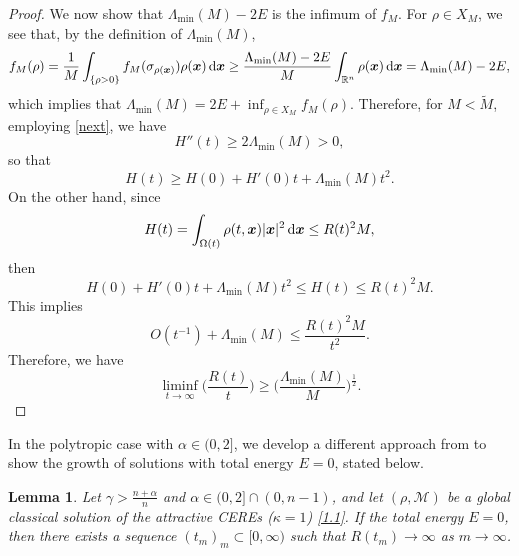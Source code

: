 \documentclass[reqno,11pt]{amsart}
\numberwithin{equation}{section}
\newtheorem{lemma}[theorem]{Lemma}
\theoremstyle{definition}
\def\dd{{\, \rm d}}
\begin{document}
\begin{proof}
We now show that $ \Lambda_{\min}(M) - 2E$ is the infimum of $f_M$. 
For $\rho \in X_M$, we see that, by the definition of $\Lambda_{\min}(M)$, 
\begin{equation*} 
    f_M(\rho) = \frac{1}{M}\int_{\{ \rho > 0 \}} f_M(\sigma_{\rho(\boldsymbol{x})}) \rho(\boldsymbol{x}) \dd \boldsymbol{x}  \geq \frac{ \Lambda_{\min}(M) -2E}{M} \int_{\mathbb{R}^n} \rho(\boldsymbol{x}) \dd \boldsymbol{x} =  \Lambda_{\min}(M) - 2E,
\end{equation*}
which implies that $\Lambda_{\min}(M) = 2E + \inf_{\rho \in X_M} f_M(\rho)$. 
Therefore, for $M < \tilde{M}$, employing \eqref{next}, we have
\[ H''(t) \geq 2 \Lambda_{\min}(M) > 0,
\]
so that 
$$
H(t)\geq H(0)+H'(0)t+ \Lambda_{\min}(M) t^2.
$$
On the other hand, since
$$
H(t)=\int_{\Omega(t)}\rho(t,\boldsymbol{x})|\boldsymbol{x}|^2\dd \boldsymbol{x}\leq R(t)^2M,
$$
then
$$
H(0)+H'(0)t+\Lambda_{\min}(M)t^2\leq H(t)\leq R(t)^2M.
$$
This implies
$$
O(t^{-1})+\Lambda_{\min}(M)\leq \frac{R(t)^2M}{t^2}.
$$
Therefore, we have
$$
\liminf_{t\rightarrow\infty}\Big(\frac{R(t)}{t}\Big)
\geq\Big(\frac{\Lambda_{\min}(M)}{M}\Big)^{\frac{1}{2}}.
$$
\end{proof}
\setcounter{case}{0}


 
In the polytropic case with $\alpha \in (0,2]$, 
we develop a different approach from \cite{Deng_2002} to show
the growth of solutions with total energy $E=0$, stated below.

\begin{lemma}
Let $\gamma>\frac{n+\alpha}{n}$ and $\alpha\in(0,2]\cap (0,n-1)$, 
and let $(\rho,\mathcal{M})$ be a global classical solution of 
the attractive CEREs {\rm (}$\kappa = 1${\rm )} \eqref{1.1}. 
If the total energy $E=0$, then there exists a sequence $(t_m)_m \subset [0,\infty)$ such that
$R(t_m) \to \infty$ as $m \to \infty$.
\end{lemma}
\end{document}

